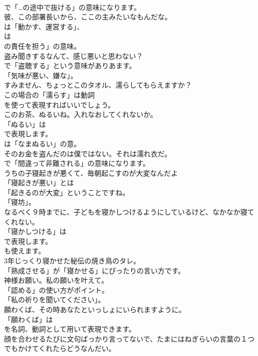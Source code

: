 \documentclass[8pt]{extreport}
\begin{document}
\begin{CJK}{UTF8}{min}
\\	で「…の途中で抜ける」の意味になります。	
\\	彼、この部署長いから、ここの主みたいなもんだな。 
\\	は「動かす、運営する」、
\\	は
\\	の責任を担う」の意味。	
\\	盗み聞きするなんて、感じ悪いと思わない？ 
\\	で「盗聴する」という意味がありあます。
\\	「気味が悪い、嫌な」。	
\\	すみません、ちょっとこのタオル、濡らしてもらえますか？ 
\\	この場合の「濡らす」は動詞 
\\	を使って表現すればいいでしょう。	
\\	このお茶、ぬるいね。入れなおしてくれないか。 
\\	「ぬるい」は 
\\	で表現します。
\\	は「なまぬるい」の意。	
\\	そのお金を盗んだのは僕ではない。それは濡れ衣だ。 
\\	で「間違って非難される」の意味になります。	
\\	うちの子寝起きが悪くて、毎朝起こすのが大変なんだよ 
\\	「寝起きが悪い」とは
\\	「起きるのが大変」ということですね。
\\	「寝坊」。	
\\	なるべく９時までに、子どもを寝かしつけるようにしているけど、なかなか寝てくれない。 
\\	「寝かしつける」は 
\\	で表現します。
\\	も使えます。	
\\	3年じっくり寝かせた秘伝の焼き鳥のタレ。 
\\	「熟成させる」が「寝かせる」にぴったりの言い方です。	
\\	神様お願い。私の願いを叶えて。 
\\	「認める」の使い方がポイント。
\\	「私の祈りを聞いてください」。	
\\	願わくば、その時あなたといっしょにいられますように。 
\\	「願わくば」は
\\	を名詞、動詞として用いて表現できます。	
\\	顔を合わせるたびに文句ばっかり言ってないで、たまにはねぎらいの言葉の１つでもかけてくれたらどうなんだい。 

\end{CJK}
\end{document}
